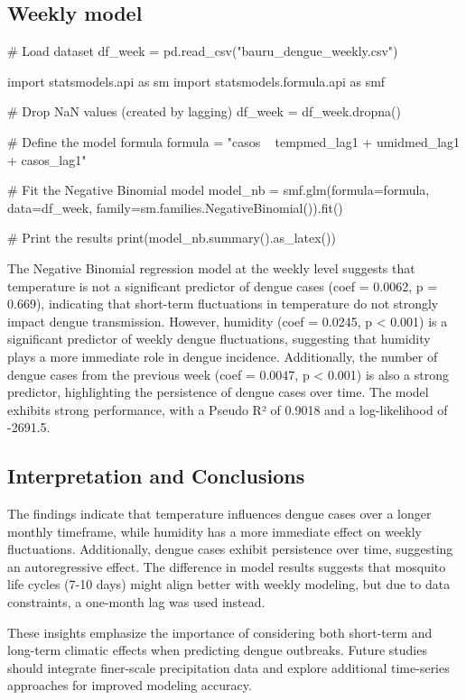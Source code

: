 \documentclass{article}
\begin{document}
\subsection*{Weekly model}

\begin{pycode}
# Load dataset
df_week = pd.read_csv("bauru_dengue_weekly.csv") 

import statsmodels.api as sm
import statsmodels.formula.api as smf

# Drop NaN values (created by lagging)
df_week = df_week.dropna()

# Define the model formula
formula = "casos ~ tempmed_lag1 + umidmed_lag1 + casos_lag1"

# Fit the Negative Binomial model
model_nb = smf.glm(formula=formula, data=df_week, 
                    family=sm.families.NegativeBinomial()).fit()

# Print the results
print(model_nb.summary().as_latex())

\end{pycode}

The Negative Binomial regression model at the weekly level suggests that temperature is not a significant predictor of dengue cases (coef = 0.0062, p = 0.669), indicating that short-term fluctuations in temperature do not strongly impact dengue transmission. However, humidity (coef = 0.0245, p < 0.001) is a significant predictor of weekly dengue fluctuations, suggesting that humidity plays a more immediate role in dengue incidence. Additionally, the number of dengue cases from the previous week (coef = 0.0047, p < 0.001) is also a strong predictor, highlighting the persistence of dengue cases over time. The model exhibits strong performance, with a Pseudo R² of 0.9018 and a log-likelihood of -2691.5.

\subsection*{Interpretation and Conclusions}

The findings indicate that temperature influences dengue cases over a longer monthly timeframe, while humidity has a more immediate effect on weekly fluctuations. Additionally, dengue cases exhibit persistence over time, suggesting an autoregressive effect. The difference in model results suggests that mosquito life cycles (7-10 days) might align better with weekly modeling, but due to data constraints, a one-month lag was used instead.

These insights emphasize the importance of considering both short-term and long-term climatic effects when predicting dengue outbreaks. Future studies should integrate finer-scale precipitation data and explore additional time-series approaches for improved modeling accuracy.
\end{document}
